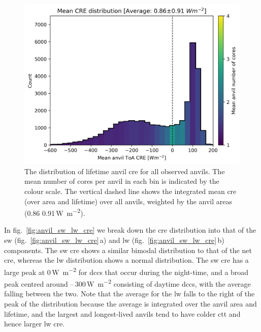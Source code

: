 \begin{figure}[tp]
    \includegraphics[width=\textwidth]{figures/ch3_11.png}
    \caption[
    The distribution of lifetime anvil \acrshort{cre} for all observed anvils
    ]{
    The distribution of lifetime anvil \acrshort{cre} for all observed anvils. The mean number of cores per anvil in each bin is indicated by the colour scale. The vertical dashed line shows the integrated mean \acrshort{cre} (over area and lifetime) over all anvils, weighted by the anvil areas (0.86\,\textpm\,0.91\,\unit{W m^{-2}}).
    }
    \label{fig:anvil_cre_dist}
\end{figure}


In fig.~\ref{fig:anvil_sw_lw_cre} we break down the \acrshort{cre} distribution into that of the \acrshort{sw} (fig.~\ref{fig:anvil_sw_lw_cre}\,a) and \acrshort{lw} (fig.~\ref{fig:anvil_sw_lw_cre}\,b) components. 
The \acrshort{sw} \acrshort{cre} shows a similar bimodal distribution to that of the net \acrshort{cre}, whereas the \acrshort{lw} distribution shows a normal distribution. 
The \acrshort{sw} \acrshort{cre} has a large peak at 0\,\unit{W m^{-2}} for \acrshort{dcc}s that occur during the night-time, and a broad peak centred around --\,300\,\unit{W m^{-2}} consisting of daytime \acrshort{dcc}s, with the average falling between the two. 
Note that the average for the \acrshort{lw} falls to the right of the peak of the distribution because the average is integrated over the anvil area and lifetime, and the largest and longest-lived anvils tend to have colder \acrshort{ctt} and hence larger \acrshort{lw} \acrshort{cre}.


